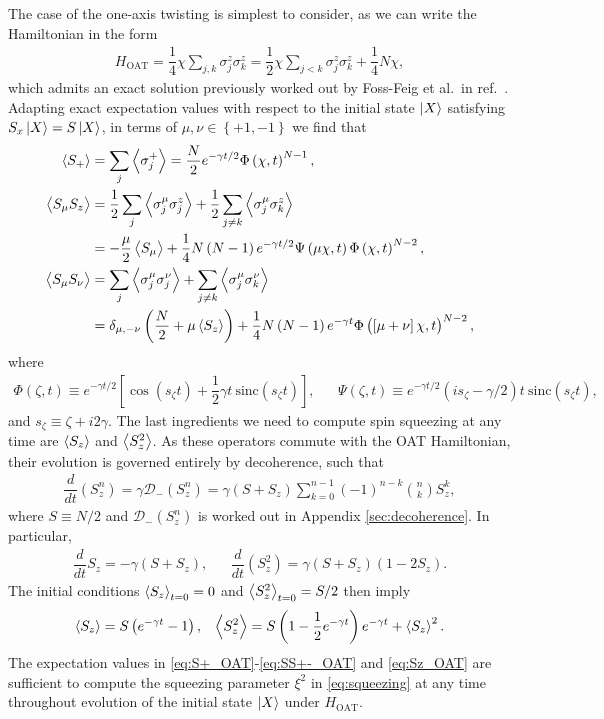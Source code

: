 \documentclass[aps,notitlepage,nofootinbib,11pt]{revtex4-1}
\renewcommand{\t}{\text} %
\newcommand{\f}[2]{\dfrac{#1}{#2}} %
\newcommand{\p}[1]{\left(#1\right)} %
\renewcommand{\sp}[1]{\left[#1\right]} %
\renewcommand{\set}[1]{\left\{#1\right\}} %
\newcommand{\bk}{\Braket} %
\newcommand{\D}{\mathcal{D}}
\newcommand{\1}{\mathds{1}}
\begin{document}
The case of the one-axis twisting is simplest to consider, as we can
write the Hamiltonian in the form
\begin{align}
  H_{\t{OAT}} = \f14 \chi \sum_{j,k} \sigma_j^z \sigma_k^z
  = \f12 \chi \sum_{j<k} \sigma_j^z \sigma_k^z + \f14 N \chi,
\end{align}
which admits an exact solution previously worked out by Foss-Feig et
al.~in ref.~\cite{foss-feig2013nonequilibrium}.  Adapting exact
expectation values with respect to the initial state $\ket{X}$
satisfying $S_x\ket{X}=S\ket{X}$, in terms of $\mu,\nu\in\set{+1,-1}$
we find that
\begin{align}
  \bk{S_+}
  &= \sum_j\bk{\sigma_j^+}
  = \f{N}{2} e^{-\gamma t/2} \Phi\p{\chi,t}^{N-1}, \label{eq:S+_OAT} \\
  \bk{S_\mu S_z}
  &= \f12\sum_j\bk{\sigma_j^\mu\sigma_j^z}
  + \f12\sum_{j\ne k} \bk{\sigma_j^\mu \sigma_k^z} \\
  &= -\f{\mu}{2}\bk{S_\mu} + \f14 N \p{N-1} e^{-\gamma t/2}
  \Psi\p{\mu\chi,t} \Phi\p{\chi,t}^{N-2}, \\
  \bk{S_\mu S_\nu}
  &= \sum_j \bk{\sigma_j^\mu \sigma_j^\nu}
  + \sum_{j\ne k} \bk{\sigma_j^\mu \sigma_k^\nu} \\
  &= \delta_{\mu,-\nu} \p{\f{N}{2} + \mu \bk{S_z}}
  + \f14 N \p{N-1} e^{-\gamma t}
  \Phi\p{\sp{\mu+\nu}\chi,t}^{N-2}, \label{eq:SS+-_OAT}
\end{align}
where
\begin{align}
  \Phi\p{\zeta,t} \equiv e^{-\gamma t/2}
  \sp{\cos\p{s_\zeta t}+\f12\gamma t~\t{sinc}\p{s_\zeta t}},
  &&
  \Psi\p{\zeta,t} \equiv e^{-\gamma t/2}
  \p{is_\zeta-\gamma/2}t~ \t{sinc}\p{s_\zeta t},
\end{align}
and $s_\zeta \equiv \zeta + i2\gamma$.  The last ingredients we need
to compute spin squeezing at any time are $\bk{S_z}$ and $\bk{S_z^2}$.
As these operators commute with the OAT Hamiltonian, their evolution
is governed entirely by decoherence, such that
\begin{align}
  \f{d}{dt}\p{S_z^n}
  = \gamma \D_-\p{S_z^n}
  = \gamma \p{S + S_z} \sum_{k=0}^{n-1}
  \p{-1}^{n-k} { n \choose k } S_z^k,
\end{align}
where $S\equiv N/2$ and $\D_-\p{S_z^n}$ is worked out in Appendix
\ref{sec:decoherence}.  In particular,
\begin{align}
  \f{d}{dt} S_z = -\gamma \p{S + S_z},
  &&
  \f{d}{dt}\p{S_z^2} = \gamma \p{S + S_z} \p{1 - 2S_z}.
\end{align}
The initial conditions $\bk{S_z}_{t=0}=0$ and $\bk{S_z^2}_{t=0}=S/2$
then imply
\begin{align}
  \bk{S_z} = S\p{e^{-\gamma t}-1},
  &&
  \bk{S_z^2} = S \p{1 - \f12 e^{-\gamma t}} e^{-\gamma t} + \bk{S_z}^2.
  \label{eq:Sz_OAT}
\end{align}
The expectation values in \eqref{eq:S+_OAT}-\eqref{eq:SS+-_OAT} and
\eqref{eq:Sz_OAT} are sufficient to compute the squeezing parameter
$\xi^2$ in \eqref{eq:squeezing} at any time throughout evolution of
the initial state $\ket{X}$ under $H_{\t{OAT}}$.
\end{document}
